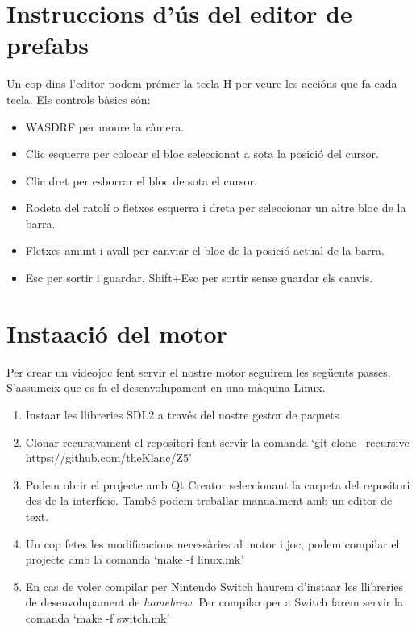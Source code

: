 \section{Instruccions d'ús del editor de prefabs}
Un cop dins l'editor podem prémer la tecla H per veure les accións que fa cada tecla.
Els controls bàsics són:
\begin{itemize}
  \item WASDRF per moure la càmera.
  \item Clic esquerre per colocar el bloc seleccionat a sota la posició del cursor.
  \item Clic dret per esborrar el bloc de sota el cursor.
  \item Rodeta del ratolí o fletxes esquerra i dreta per seleccionar un altre bloc de la barra.
  \item Fletxes amunt i avall per canviar el bloc de la posició actual de la barra.
  \item Esc per sortir i guardar, Shift+Esc per sortir sense guardar els canvis.
\end{itemize}
\section{Insta\lgem ació del motor}
Per crear un videojoc fent servir el nostre motor seguirem les següents passes. S'assumeix que es fa el desenvolupament en una màquina Linux.
\begin{enumerate}
  \item Insta\lgem ar les llibreries SDL2 a través del nostre gestor de paquets.
  \item Clonar recursivament el repositori fent servir la comanda `git clone --recursive https://github.com/theKlanc/Z5'
  \item Podem obrir el projecte amb Qt Creator seleccionant la carpeta del repositori des de la interfície. També podem treballar manualment amb un editor de text.
  \item Un cop fetes les modificacions necessàries al motor i joc, podem compilar el projecte amb la comanda `make -f linux.mk'
  \item En cas de voler compilar per Nintendo Switch haurem d'insta\lgem ar les llibreries de desenvolupament de \textit{homebrew}. Per compilar per a Switch farem servir la comanda `make -f switch.mk'
\end{enumerate}

